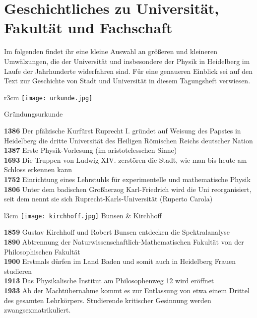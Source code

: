 
\section*{Geschichtliches zu Universität, Fakultät und Fachschaft}

Im folgenden findet ihr eine kleine Auswahl an größeren und kleineren Umwälzungen, die der Universität und insbesondere der Physik in Heidelberg im Laufe der Jahrhunderte widerfahren sind. Für eine genaueren Einblick sei auf den Text zur Geschichte von Stadt und Universität in diesem Tagungsheft verwiesen.

\begin{wrapfigure}[]{r}{3cm}
\vspace{-13pt}
\texttt{[image: urkunde.jpg]}

\small{Gründungsurkunde}
\end{wrapfigure}

\textbf{1386} Der pfälzische Kurfürst Ruprecht I. gründet auf Weisung des Papstes in Heidelberg die dritte Universität des Heiligen Römischen Reichs deutscher Nation\\
\textbf{1387}  Erste Physik-Vorlesung (im aristotelesschen Sinne)\\
\textbf{1693} Die Truppen von Ludwig XIV. zerstören die Stadt, wie man bis heute am Schloss erkennen kann\\
\textbf{1752} Einrichtung eines Lehrstuhls für experimentelle und mathematische Physik\\
\textbf{1806} Unter dem badischen Großherzog Karl-Friedrich wird die Uni reorganisiert, seit dem nennt sie sich Ruprecht-Karls-Universität (Ruperto Carola)

\begin{wrapfigure}{l}{3cm}
\vspace{-13pt}
\texttt{[image: kirchhoff.jpg]}
\small{Bunsen \& Kirchhoff}
\vspace{-13pt}
\end{wrapfigure}

\textbf{1859} Gustav Kirchhoff und Robert Bunsen entdecken die Spektralanalyse\\
\textbf{1890} Abtrennung der Naturwissenschaftlich-Mathematischen Fakultät von der Philosophischen Fakultät\\
\textbf{1900} Erstmals dürfen im Land Baden und somit auch in Heidelberg Frauen studieren\\
\textbf{1913} Das Physikalische Institut am Philosophenweg 12 wird eröffnet\\
\textbf{1933} Ab der Machtübernahme kommt es zur Entlassung von etwa einem Drittel des gesamten Lehrkörpers. Studierende kritischer Gesinnung werden zwangsexmatrikuliert. 

